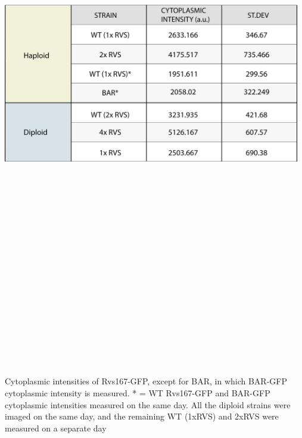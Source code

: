 \newpage
\begin{table}[H]
	\centering
	\includegraphics[width=13cm,height=25cm,keepaspectratio]{figures/results_final/table2}
	\caption[Cytoplasmic intensities]
	{ Cytoplasmic intensities of Rvs167-GFP, except for BAR, in which BAR-GFP cytoplasmic intensity is measured. * = WT Rvs167-GFP and BAR-GFP cytoplasmic intensities measured on the same day. All the diploid strains were imaged on the same day, and the remaining WT (1xRVS) and 2xRVS were measured on a separate day
		\label{table2}}
\end{table}